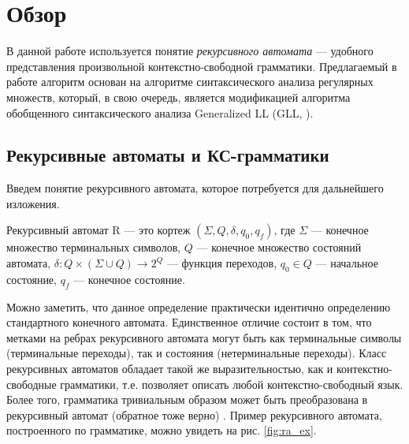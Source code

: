 \section{Обзор}

В данной работе используется понятие \textit{рекурсивного автомата} \cite{tellier2006ra} --- удобного представления произвольной контекстно-свободной грамматики.
Предлагаемый в работе алгоритм основан на алгоритме синтаксического анализа регулярных множеств, который, в свою очередь, является модификацией алгоритма обобщенного синтаксического анализа Generalized LL (GLL, \cite{gll}).

\subsection{Рекурсивные автоматы и КС-грамматики}
Введем понятие рекурсивного автомата, которое потребуется для дальнейшего изложения.

\begin{defn}
	Рекурсивный автомат R --- это кортеж $(\Sigma, Q, \delta, q_0, q_f)$, где $\Sigma$ --- конечное множество терминальных символов, $Q$ --- конечное множество состояний автомата, $\delta : Q \times (\Sigma \cup Q) \rightarrow 2^Q$ --- функция переходов, $q_0 \in Q$ --- начальное состояние, $q_f$ --- конечное состояние. 
\end{defn}

Можно заметить, что данное определение практически идентично определению стандартного конечного автомата. 
Единственное отличие состоит в том, что метками на ребрах рекурсивного автомата могут быть как терминальные символы (терминальные переходы), так и состояния (нетерминальные переходы).
Класс рекурсивных автоматов обладает такой же выразительностью, как и контекстно-свободные грамматики, т.е. позволяет описать любой контекстно-свободный язык. 
Более того, грамматика тривиальным образом может быть преобразована в рекурсивный автомат (обратное тоже верно) \cite{tellier2006ra}. 
Пример рекурсивного автомата, построенного по грамматике, можно увидеть на рис. \ref{fig:ra_ex}.

